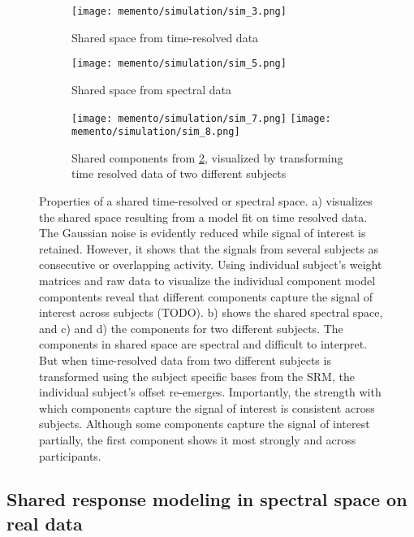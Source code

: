 \begin{figure}
	\begin{subfigure}{.49\textwidth}
		\texttt{[image: memento/simulation/sim\_3.png]}
		\caption{Shared space from time-resolved data}
		\label{fig:sim-timeresolved-shared}
	\end{subfigure}
	\begin{subfigure}{.49\textwidth}
		\texttt{[image: memento/simulation/sim\_5.png]}
		\caption{Shared space from spectral data}
		\label{fig:sim-spectral-shared}
	\end{subfigure}
	\hfill
	\begin{subfigure}{1.\textwidth}
		\texttt{[image: memento/simulation/sim\_7.png]}
		\texttt{[image: memento/simulation/sim\_8.png]}
		\caption{Shared components from \ref{fig:sim-spectral-shared}, visualized by transforming time resolved data of two different subjects}
		\label{fig:sim-shared-transformed}
	\end{subfigure}
	\caption[Properties of a shared time-resolved or spectral space]{Properties of a shared time-resolved or spectral space. a) visualizes the shared space resulting from a model fit on time resolved data. The Gaussian noise is evidently reduced while signal of interest is retained. However, it shows that the signals from several subjects as consecutive or overlapping activity. Using individual subject's weight matrices and raw data to visualize the individual component model compontents reveal that different components capture the signal of interest across subjects (TODO). b) shows the shared spectral space, and c) and d) the components for two different subjects. The components in shared space are spectral and difficult to interpret. But when time-resolved data from two different subjects is transformed using the subject specific bases from the \gls{SRM}, the individual subject's offset re-emerges. Importantly, the strength with which components capture the signal of interest is consistent across subjects. Although some components capture the signal of interest partially, the first component shows it most strongly and across participants.}
	\label{fig:sim-spectral}
\end{figure}




\subsection{Shared response modeling in spectral space on real data}

